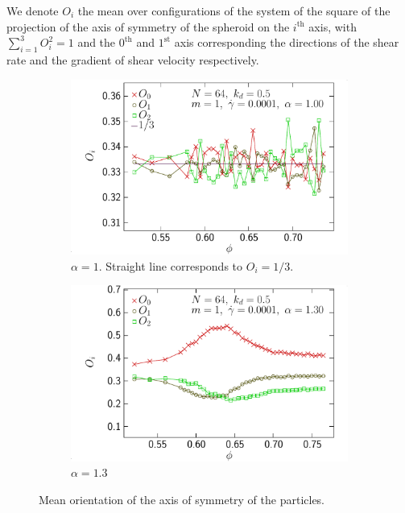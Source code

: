 \documentclass[class=report, float=false, crop=false]{standalone}
\begin{document}
We denote $O_i$ the mean over configurations of the system of the square of the projection of the axis of symmetry of the spheroid on the $i^{\text{th}}$ axis, with $\sum_{i=1}^3 O_i^2 = 1$ and the $0^{\text{th}}$ and $1^{\text{st}}$ axis corresponding the directions of the shear rate and the gradient of shear velocity respectively.

\begin{figure}[h!]
\centering
    \begin{subfigure}[t]{0.49\textwidth}
        \centering
        \includegraphics[width=\textwidth]{figures/figs/ori_phi_0064_KDk500_Ml100_GDh100_EL100}
        \caption{$\alpha=1$. Straight line corresponds to $O_i=1/3$.}
        \label{ori_phi_0064_KDk500_Ml100_GDh100_EL100}
    \end{subfigure}
    \hfill
    \begin{subfigure}[t]{0.49\textwidth}
        \centering
        \includegraphics[width=\textwidth]{figures/figs/ori_phi_0064_KDk500_Ml100_GDh100_EL130}
        \caption{$\alpha=1.3$}
        \label{ori_phi_0064_KDk500_Ml100_GDh100_EL130}
    \end{subfigure}
    \caption{Mean orientation of the axis of symmetry of the particles.}
    \label{ori_phi_0064}
\end{figure}
\end{document}
